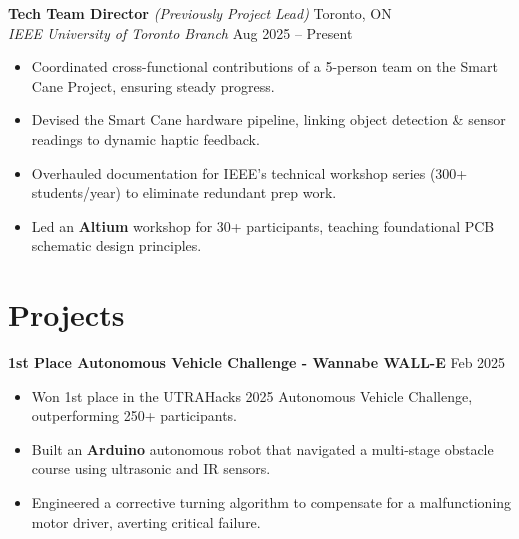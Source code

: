 \documentclass[10pt,letterpaper]{article}
\begin{document}
\vspace{0.25em}
\textbf{Tech Team Director} \textit{(Previously Project Lead)} \hfill 
Toronto, ON \\
\textit{IEEE University of Toronto Branch} \hfill
Aug 2025 -- Present \\
\begin{itemize}
    \item Coordinated cross-functional contributions of a 5-person team on the Smart Cane Project, ensuring steady progress. 
    \item Devised the Smart Cane hardware pipeline, linking object detection \& sensor readings to dynamic haptic feedback. 
    \item Overhauled documentation for IEEE's technical workshop series (300+ students/year) to eliminate redundant prep work.
    \item Led an \textbf{Altium} workshop for 30+ participants, teaching foundational PCB schematic design principles.
\end{itemize}




\section{Projects}

\textbf{1st Place Autonomous Vehicle Challenge - Wannabe WALL-E} \hfill Feb 2025 \\
\begin{itemize}
    \item Won 1st place in the UTRAHacks 2025 Autonomous Vehicle Challenge, outperforming 250+ participants. 
    \item Built an \textbf{Arduino} autonomous robot that navigated a multi-stage obstacle course using ultrasonic and IR sensors.
    \item Engineered a corrective turning algorithm to compensate for a malfunctioning motor driver, averting critical failure. 
\end{itemize}
\end{document}
